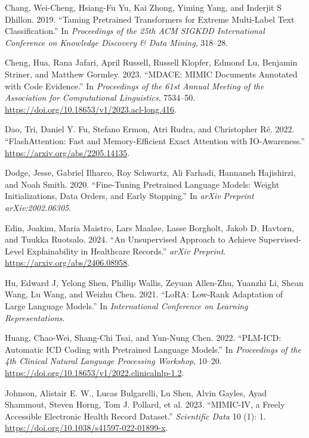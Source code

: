\documentclass[
]{article}
\newlength{\cslhangindent}
\newenvironment{CSLReferences}[2] %
 {\begin{list}{}{%
  \setlength{\itemindent}{0pt}
  \setlength{\leftmargin}{0pt}
  \setlength{\parsep}{0pt}
  \ifodd #1
   \setlength{\leftmargin}{\cslhangindent}
   \setlength{\itemindent}{-1\cslhangindent}
  \fi
  \setlength{\itemsep}{#2\baselineskip}}}
 {\end{list}}
\begin{document}
\label{refs}
\begin{CSLReferences}{1}{0}
Chang, Wei-Cheng, Hsiang-Fu Yu, Kai Zhong, Yiming Yang, and Inderjit S
Dhillon. 2019. {``Taming Pretrained Transformers for Extreme Multi-Label
Text Classification.''} In \emph{Proceedings of the 25th ACM SIGKDD
International Conference on Knowledge Discovery \& Data Mining},
318--28.

Cheng, Hua, Rana Jafari, April Russell, Russell Klopfer, Edmond Lu,
Benjamin Striner, and Matthew Gormley. 2023. {``MDACE: MIMIC Documents
Annotated with Code Evidence.''} In \emph{Proceedings of the 61st Annual
Meeting of the Association for Computational Linguistics}, 7534--50.
\url{https://doi.org/10.18653/v1/2023.acl-long.416}.

Dao, Tri, Daniel Y. Fu, Stefano Ermon, Atri Rudra, and Christopher Ré.
2022. {``FlashAttention: Fast and Memory-Efficient Exact Attention with
IO-Awareness.''} \url{https://arxiv.org/abs/2205.14135}.

Dodge, Jesse, Gabriel Ilharco, Roy Schwartz, Ali Farhadi, Hannaneh
Hajishirzi, and Noah Smith. 2020. {``Fine-Tuning Pretrained Language
Models: Weight Initializations, Data Orders, and Early Stopping.''} In
\emph{arXiv Preprint arXiv:2002.06305}.

Edin, Joakim, Maria Maistro, Lars Maaløe, Lasse Borgholt, Jakob D.
Havtorn, and Tuukka Ruotsalo. 2024. {``An Unsupervised Approach to
Achieve Supervised-Level Explainability in Healthcare Records.''}
\emph{arXiv Preprint}. \url{https://arxiv.org/abs/2406.08958}.

Hu, Edward J, Yelong Shen, Phillip Wallis, Zeyuan Allen-Zhu, Yuanzhi Li,
Shean Wang, Lu Wang, and Weizhu Chen. 2021. {``LoRA: Low-Rank Adaptation
of Large Language Models.''} In \emph{International Conference on
Learning Representations}.

Huang, Chao-Wei, Shang-Chi Tsai, and Yun-Nung Chen. 2022. {``PLM-ICD:
Automatic ICD Coding with Pretrained Language Models.''} In
\emph{Proceedings of the 4th Clinical Natural Language Processing
Workshop}, 10--20.
\url{https://doi.org/10.18653/v1/2022.clinicalnlp-1.2}.

Johnson, Alistair E. W., Lucas Bulgarelli, Lu Shen, Alvin Gayles, Ayad
Shammout, Steven Horng, Tom J. Pollard, et al. 2023. {``MIMIC-IV, a
Freely Accessible Electronic Health Record Dataset.''} \emph{Scientific
Data} 10 (1): 1. \url{https://doi.org/10.1038/s41597-022-01899-x}.


\end{CSLReferences}
\end{document}
